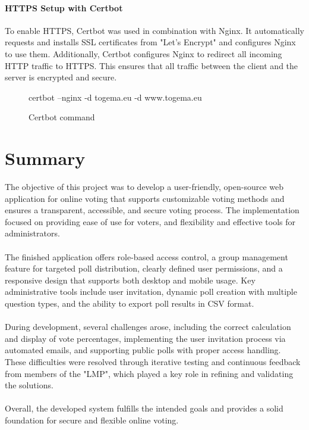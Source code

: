 \documentclass[a4paper,12pt]{report}
\begin{document}
\subsubsection{HTTPS Setup with Certbot}
To enable HTTPS, Certbot was used in combination with Nginx. It automatically requests and installs SSL certificates from "Let’s Encrypt" and configures Nginx to use them. Additionally, Certbot configures Nginx to redirect all incoming HTTP traffic to HTTPS. This ensures that all traffic between the client and the server is encrypted and secure.
\begin{figure}[H]
	\begin{terminal}
		certbot --nginx -d togema.eu -d www.togema.eu
	\end{terminal}
	\caption{Certbot command}
\end{figure}

\chapter{Summary}
The objective of this project was to develop a user-friendly, open-source web application for online voting that supports customizable voting methods and ensures a transparent, accessible, and secure voting process. The implementation focused on providing ease of use for voters, and flexibility and effective tools for administrators. \\\\
The finished application offers role-based access control, a group management feature for targeted poll distribution, clearly defined user permissions, and a responsive design that supports both desktop and mobile usage. Key administrative tools include user invitation, dynamic poll creation with multiple question types, and the ability to export poll results in CSV format. \\\\
During development, several challenges arose, including the correct calculation and display of vote percentages, implementing the user invitation process via automated emails, and supporting public polls with proper access handling. These difficulties were resolved through iterative testing and continuous feedback from members of the "LMP", which played a key role in refining and validating the solutions. \\\\
Overall, the developed system fulfills the intended goals and provides a solid foundation for secure and flexible online voting. \\
\end{document}
